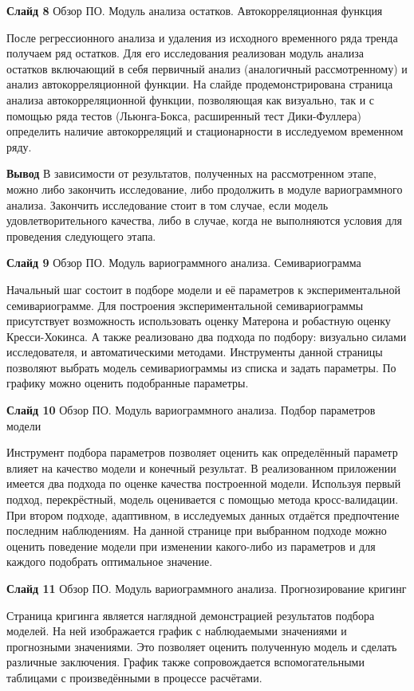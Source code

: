 \documentclass[a4paper,10pt]{report}
\begin{document}
\textbf{Слайд 8} Обзор ПО. Модуль анализа остатков. Автокорреляционная функция

После регрессионного анализа и удаления из исходного временного ряда тренда получаем ряд остатков. Для его исследования реализован модуль анализа остатков включающий в себя первичный анализ (аналогичный рассмотренному) и анализ автокорреляционной функции. На слайде продемонстрирована страница анализа автокорреляционной функции, позволяющая как визуально, так и с помощью ряда тестов (Льюнга-Бокса, расширенный тест Дики-Фуллера) определить наличие автокорреляций и стационарности в исследуемом временном ряду.

\textbf{Вывод} В зависимости от результатов, полученных на рассмотренном этапе, можно либо закончить исследование, либо продолжить в модуле вариограммного анализа. Закончить исследование стоит в том случае, если модель удовлетворительного качества, либо в случае, когда не выполняются условия для проведения следующего этапа.

\textbf{Слайд 9} Обзор ПО. Модуль вариограммного анализа. Семивариограмма

Начальный шаг состоит в подборе модели и её параметров к экспериментальной семивариограмме. Для построения экспериментальной семивариограммы присутствует возможность использовать оценку Матерона и робастную оценку Кресси-Хокинса. А также реализовано два подхода по подбору: визуально силами исследователя, и автоматическими методами. Инструменты данной страницы позволяют выбрать модель семивариограммы из списка и задать параметры. По графику можно оценить подобранные параметры.

\textbf{Слайд 10} Обзор ПО. Модуль вариограммного анализа. Подбор параметров модели

Инструмент подбора параметров позволяет оценить как определённый параметр влияет на качество модели и конечный результат. В реализованном приложении имеется два подхода по оценке качества построенной модели. Используя первый подход, перекрёстный, модель оценивается с помощью метода кросс-валидации. При втором подходе, адаптивном, в исследуемых данных отдаётся предпочтение последним наблюдениям. На данной странице при выбранном подходе можно оценить поведение модели при изменении какого-либо из параметров и для каждого подобрать оптимальное значение.

\textbf{Слайд 11} Обзор ПО. Модуль вариограммного анализа. Прогнозирование кригинг

Страница кригинга является наглядной демонстрацией результатов подбора моделей. На ней изображается график с наблюдаемыми значениями и прогнозными значениями. Это позволяет оценить полученную модель и сделать различные заключения. График также сопровождается вспомогательными таблицами с произведёнными в процессе расчётами.
\end{document}

